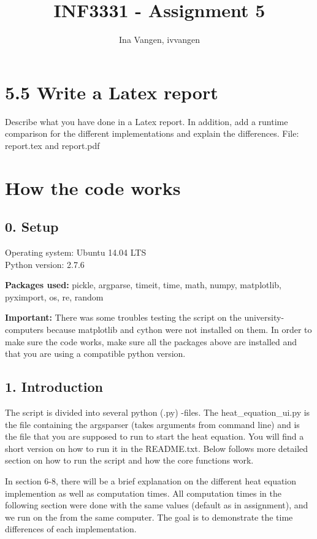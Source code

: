 \documentclass[a4paper]{article}
\title{INF3331 - Assignment 5}
\author{Ina Vangen, ivvangen}
\begin{document}
\maketitle

\section*{5.5 Write a Latex report}

Describe what you have done in a Latex report. In addition, add a runtime
comparison for the different implementations and explain the differences.
File: report.tex and report.pdf 

\section*{How the code works}
\subsection*{0. Setup}
\begin{flushleft}
Operating system: Ubuntu 14.04 LTS \\
Python version: 2.7.6 \newline  

\textbf{Packages used:} pickle, argparse, timeit, time, math, numpy, matplotlib, pyximport, os, re, random \newline
 
\textbf{Important:} There was some troubles testing the script on the university-computers because matplotlib and cython were not installed on them. In order to make sure the code works, make sure all the packages above are installed and that you are using a compatible python version.
\end{flushleft}        

\subsection*{1. Introduction}
\begin{flushleft}
The script is divided into several python (.py) -files. The heat\_equation\_ui.py is the file containing the argsparser (takes arguments from command line) and is the file that you are supposed to run to start the heat equation. You will find a short version on how to run it in the README.txt. Below follows more detailed section on how to run the script and how the core functions work. \newline

In section 6-8, there will be a brief explanation on the different heat equation implemention as well as computation times. All computation times in the following section were done with the same values (default as in assignment), and we run on the from the same computer. The goal is to demonstrate the time differences of each implementation. \newline
\end{flushleft}                           
\end{document}
